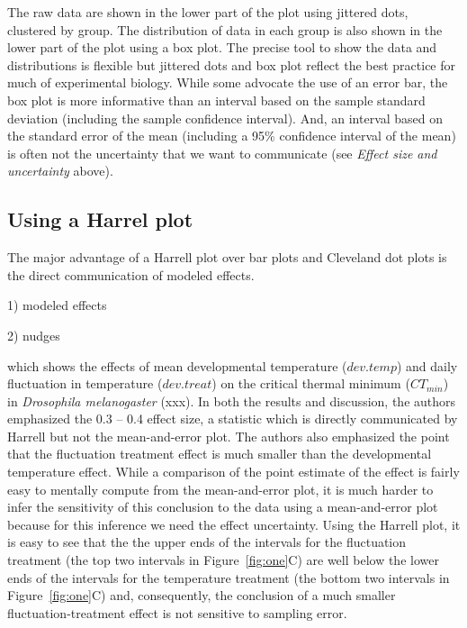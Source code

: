 \documentclass[fleqn,10pt,lineno]{wlpeerj} %
\begin{document}
The raw data are shown in the lower part of the plot using jittered dots, clustered by group. The distribution of data in each group is also shown in the lower part of the plot using a box plot. The precise tool to show the data and distributions is flexible but jittered dots and box plot reflect the best practice for much of experimental biology. While some advocate the use of an error bar, the box plot is more informative than an interval based on the sample standard deviation (including the sample confidence interval). And, an interval based on the standard error of the mean (including a 95\% confidence interval of the mean) is often not the uncertainty that we want to communicate (see \textit{Effect size and uncertainty} above).

\subsection*{Using a Harrel plot}

The major advantage of a Harrell plot over bar plots and Cleveland dot plots is the direct communication of modeled effects.


1) modeled effects

2) nudges

which shows the effects of mean developmental temperature ($dev.temp$) and daily fluctuation in temperature ($dev.treat$) on the critical thermal minimum ($CT_{min}$) in \textit{Drosophila melanogaster} (xxx). In both the results and discussion, the authors emphasized the 0.3 -- 0.4 effect size, a statistic which is directly communicated by Harrell but not the mean-and-error plot. The authors also emphasized the point that the fluctuation treatment effect is much smaller than the developmental temperature effect. While a comparison of the point estimate of the effect is fairly easy to mentally compute from the mean-and-error plot, it is much harder to infer the sensitivity of this conclusion to the data using a mean-and-error plot because for this inference we need the effect uncertainty. Using the Harrell plot, it is easy to see that the the upper ends of the intervals for the fluctuation treatment (the top two intervals in Figure~\ref{fig:one}C) are well below the lower ends of the intervals for the temperature treatment (the bottom two intervals in Figure~\ref{fig:one}C) and, consequently, the conclusion of a much smaller fluctuation-treatment effect is not sensitive to sampling error.
\end{document}
